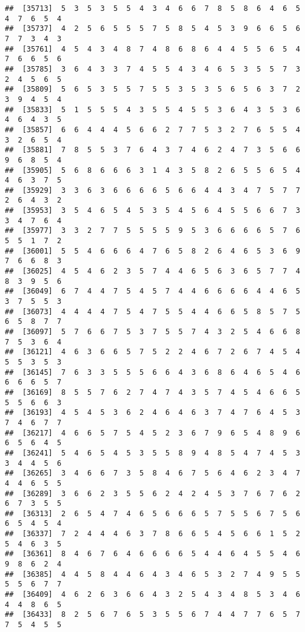 \documentclass[
]{book}
\begin{document}
\begin{verbatim}
##  [35713]  5  3  5  3  5  5  4  3  4  6  6  7  8  5  8  6  4  6  5  4  7  6  5  4
##  [35737]  4  2  5  6  5  5  5  7  5  8  5  4  5  3  9  6  6  5  6  7  7  3  4  3
##  [35761]  4  5  4  3  4  8  7  4  8  6  8  6  4  4  5  5  6  5  4  7  6  6  5  6
##  [35785]  3  6  4  3  3  7  4  5  5  4  3  4  6  5  3  5  5  7  3  2  4  5  6  5
##  [35809]  5  6  5  3  5  5  7  5  5  3  5  3  5  6  5  6  3  7  2  3  9  4  5  4
##  [35833]  5  1  5  5  5  4  3  5  5  4  5  5  3  6  4  3  5  3  6  4  6  4  3  5
##  [35857]  6  6  4  4  4  5  6  6  2  7  7  5  3  2  7  6  5  5  4  3  2  6  5  4
##  [35881]  7  8  5  5  3  7  6  4  3  7  4  6  2  4  7  3  5  6  6  9  6  8  5  4
##  [35905]  5  6  8  6  6  6  3  1  4  3  5  8  2  6  5  5  6  5  4  4  6  3  7  5
##  [35929]  3  3  6  3  6  6  6  6  5  6  6  4  4  3  4  7  5  7  7  2  6  4  3  2
##  [35953]  3  5  4  6  5  4  5  3  5  4  5  6  4  5  5  6  6  7  3  3  4  7  6  4
##  [35977]  3  3  2  7  7  5  5  5  5  9  5  3  6  6  6  6  5  7  6  5  5  1  7  2
##  [36001]  5  5  4  6  6  6  4  7  6  5  8  2  6  4  6  5  3  6  9  7  6  6  8  3
##  [36025]  4  5  4  6  2  3  5  7  4  4  6  5  6  3  6  5  7  7  4  8  3  9  5  6
##  [36049]  6  7  4  4  7  5  4  5  7  4  4  6  6  6  6  4  4  6  5  3  7  5  5  3
##  [36073]  4  4  4  4  7  5  4  7  5  5  4  4  6  6  5  8  5  7  5  6  5  8  7  7
##  [36097]  5  7  6  6  7  5  3  7  5  5  7  4  3  2  5  4  6  6  8  7  5  3  6  4
##  [36121]  4  6  3  6  6  5  7  5  2  2  4  6  7  2  6  7  4  5  4  5  5  3  5  3
##  [36145]  7  6  3  3  5  5  5  6  6  4  3  6  8  6  4  6  5  4  6  6  6  6  5  7
##  [36169]  8  5  5  7  6  2  7  4  7  4  3  5  7  4  5  4  6  6  5  5  5  6  6  3
##  [36193]  4  5  4  5  3  6  2  4  6  4  6  3  7  4  7  6  4  5  3  7  4  6  7  7
##  [36217]  4  6  6  5  7  5  4  5  2  3  6  7  9  6  5  4  8  9  6  6  5  6  4  5
##  [36241]  5  4  6  5  4  5  3  5  5  8  9  4  8  5  4  7  4  5  3  3  4  4  5  6
##  [36265]  3  4  6  6  7  3  5  8  4  6  7  5  6  4  6  2  3  4  7  4  4  6  5  5
##  [36289]  3  6  6  2  3  5  5  6  2  4  2  4  5  3  7  6  7  6  2  6  7  3  5  5
##  [36313]  2  6  5  4  7  4  6  5  6  6  6  5  7  5  5  6  7  5  6  6  5  4  5  4
##  [36337]  7  2  4  4  4  6  3  7  8  6  6  5  4  5  6  6  1  5  2  5  4  6  3  5
##  [36361]  8  4  6  7  6  4  6  6  6  6  5  4  4  6  4  5  5  4  6  9  8  6  2  4
##  [36385]  4  4  5  8  4  4  6  4  3  4  6  5  3  2  7  4  9  5  5  5  5  6  7  7
##  [36409]  4  6  2  6  3  6  6  4  3  2  5  4  3  4  8  5  3  4  6  4  4  8  6  5
##  [36433]  8  2  5  6  7  6  5  3  5  5  6  7  4  4  7  7  6  5  7  7  5  4  5  5

\end{verbatim}
\end{document}
